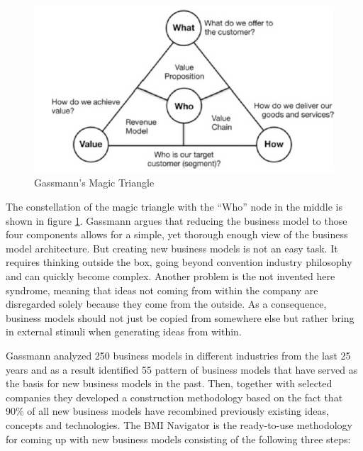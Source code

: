 		\begin{figure}[ht]
		    \begin{center}
		    \includegraphics[scale=0.6]{Talk11/Figure1.png}
		    \end{center}
		    \caption{Gassmann's Magic Triangle \cite[p.91]{gassmann55}}
		    \label{fig:m_triangle}
		\end{figure}
		The constellation of the magic triangle with the ``Who'' node in the middle is shown in figure \ref{fig:m_triangle}.
		Gassmann argues that reducing the business model to those four components allows for a simple, yet thorough enough view of the business model architecture. But creating new business models is not an easy task. It requires thinking outside the box, going beyond convention industry philosophy and can quickly become complex. Another problem is the not invented here syndrome, meaning that ideas not coming from within the company are disregarded solely because they come from the outside. As a consequence, business models should not just be copied from somewhere else but rather bring in external stimuli when generating ideas from within.

		Gassmann analyzed 250 business models in different industries from the last 25 years and as a result identified 55 pattern of business models that have served as the basis for new business models in the past. Then, together with selected companies they developed a construction methodology based on the fact that 90\% of all new business models have recombined previously existing ideas, concepts and  technologies. The BMI Navigator is the ready-to-use methodology for coming up with new business models consisting of the following three steps:

